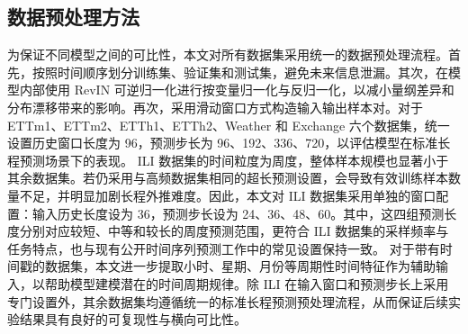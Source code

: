 \subsection{数据预处理方法} 为保证不同模型之间的可比性，本文对所有数据集采用统一的数据预处理流程。首先，按照时间顺序划分训练集、验证集和测试集，避免未来信息泄漏。其次，在模型内部使用 RevIN 可逆归一化进行按变量归一化与反归一化，以减小量纲差异和分布漂移带来的影响。再次，采用滑动窗口方式构造输入输出样本对\cite{kim2022revin}。对于 ETTm1、ETTm2、ETTh1、ETTh2、Weather 和 Exchange 六个数据集，统一设置历史窗口长度为 96，预测步长为 96、192、336、720，以评估模型在标准长程预测场景下的表现。 ILI 数据集的时间粒度为周度，整体样本规模也显著小于其余数据集。若仍采用与高频数据集相同的超长预测设置，会导致有效训练样本数量不足，并明显加剧长程外推难度。因此，本文对 ILI 数据集采用单独的窗口配置：输入历史长度设为 36，预测步长设为 24、36、48、60。其中，这四组预测长度分别对应较短、中等和较长的周度预测范围，更符合 ILI 数据集的采样频率与任务特点，也与现有公开时间序列预测工作中的常见设置保持一致。 对于带有时间戳的数据集，本文进一步提取小时、星期、月份等周期性时间特征作为辅助输入，以帮助模型建模潜在的时间周期规律。除 ILI 在输入窗口和预测步长上采用专门设置外，其余数据集均遵循统一的标准长程预测预处理流程，从而保证后续实验结果具有良好的可复现性与横向可比性。
